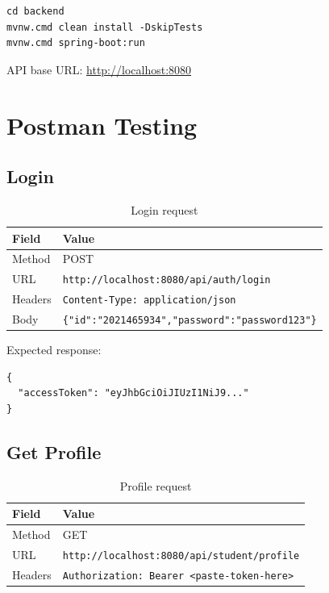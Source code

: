 \documentclass[11pt,a4paper]{article}
\begin{document}
\begin{lstlisting}[style=properties, caption={Commands (Windows)}]
cd backend
mvnw.cmd clean install -DskipTests
mvnw.cmd spring-boot:run
\end{lstlisting}

API base URL: \url{http://localhost:8080}

\section{Postman Testing}

\subsection{Login}

\begin{table}[h]
\centering
\begin{tabular}{@{}ll@{}}
\toprule
\textbf{Field} & \textbf{Value} \\
\midrule
Method  & POST \\
URL     & \texttt{http://localhost:8080/api/auth/login} \\
Headers & \texttt{Content-Type: application/json} \\
Body    & \texttt{\{"id":"2021465934","password":"password123"\}} \\
\bottomrule
\end{tabular}
\caption{Login request}
\end{table}

Expected response:

\begin{lstlisting}[style=properties]
{
  "accessToken": "eyJhbGciOiJIUzI1NiJ9..."
}
\end{lstlisting}

\subsection{Get Profile}

\begin{table}[h]
\centering
\begin{tabular}{@{}ll@{}}
\toprule
\textbf{Field} & \textbf{Value} \\
\midrule
Method  & GET \\
URL     & \texttt{http://localhost:8080/api/student/profile} \\
Headers & \texttt{Authorization: Bearer <paste-token-here>} \\
\bottomrule
\end{tabular}
\caption{Profile request}
\end{table}
\end{document}
